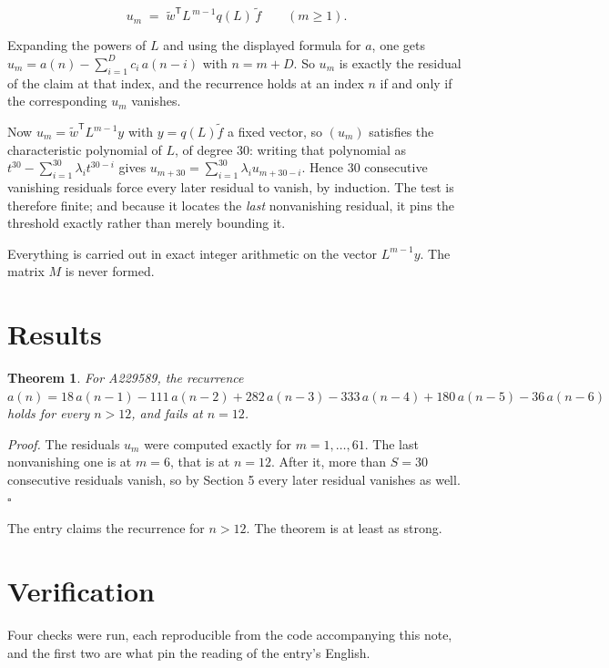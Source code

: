\documentclass[11pt]{article}
\newtheorem{theorem}{Theorem}
\theoremstyle{definition}
\begin{document}
\[u_m \;=\; \tilde w^{\mathsf T} L^{\,m-1} q(L)\,\tilde f \qquad (m \ge 1).\]

Expanding the powers of $L$ and using the displayed formula for $a$, one gets $u_m = a(n) - \sum_{i=1}^{D} c_i\,a(n-i)$ with $n = m + D$. So $u_m$ is exactly the residual of the claim at that index, and the recurrence holds at an index $n$ if and only if the corresponding $u_m$ vanishes.

Now $u_m = \tilde w^{\mathsf T} L^{m-1} y$ with $y = q(L)\tilde f$ a fixed vector, so $(u_m)$ satisfies the characteristic polynomial of $L$, of degree $30$: writing that polynomial as $t^{30} - \sum_{i=1}^{30} \lambda_i t^{30-i}$ gives $u_{m+30} = \sum_{i=1}^{30} \lambda_i u_{m+30-i}$. Hence $30$ consecutive vanishing residuals force every later residual to vanish, by induction. The test is therefore finite; and because it locates the {\itshape last} nonvanishing residual, it pins the threshold exactly rather than merely bounding it.

Everything is carried out in exact integer arithmetic on the vector $L^{m-1}y$. The matrix $M$ is never formed.

\section{Results}

\begin{theorem} For A229589, the recurrence $a(n) = 18\,a(n-1) - 111\,a(n-2) + 282\,a(n-3) - 333\,a(n-4) + 180\,a(n-5) - 36\,a(n-6)$ holds for every $n > 12$, and fails at $n = 12$.\end{theorem}

{\itshape Proof.} The residuals $u_m$ were computed exactly for $m = 1,\dots,61$. The last nonvanishing one is at $m = 6$, that is at $n = 12$. After it, more than $S = 30$ consecutive residuals vanish, so by Section 5 every later residual vanishes as well. $\square$

The entry claims the recurrence for $n > 12$. The theorem is at least as strong.

\section{Verification}

Four checks were run, each reproducible from the code accompanying this note, and the first two are what pin the reading of the entry's English.
\end{document}
